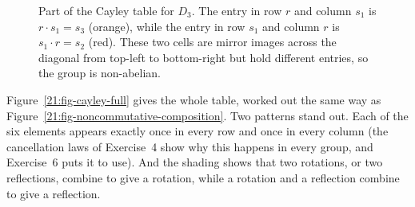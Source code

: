 \begin{figure}[htbp]
\caption{Part of the Cayley table for $D_3$. The entry in row $r$ and column $s_1$ is $r \cdot s_1 = s_3$ (orange), while the entry in row $s_1$ and column $r$ is $s_1 \cdot r = s_2$ (red). These two cells are mirror images across the diagonal from top-left to bottom-right but hold different entries, so the group is non-abelian.}\label{21:fig-cayley-table}
\end{figure}

Figure~\ref{21:fig-cayley-full} gives the whole table, worked out the same way as Figure~\ref{21:fig-noncommutative-composition}. Two patterns stand out. Each of the six elements appears exactly once in every row and once in every column (the cancellation laws of Exercise~4 show why this happens in every group, and Exercise~6 puts it to use). And the shading shows that two rotations, or two reflections, combine to give a rotation, while a rotation and a reflection combine to give a reflection.

